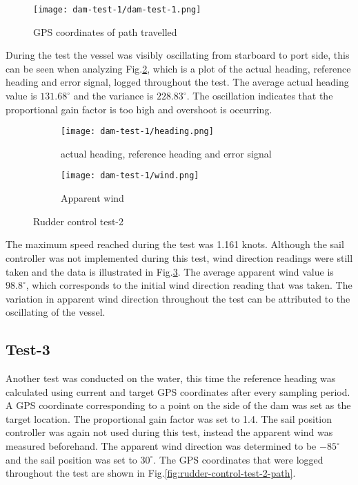 
\begin{figure}[h!]
    \centering
    \texttt{[image: dam-test-1/dam-test-1.png]}
    \caption[Path travelled in first rudder control test]{GPS coordinates of path travelled}
    \label{fig:rudder-control-test-1-path}
\end{figure}

 
During the test the vessel was visibly oscillating from starboard to port side, this can be seen when analyzing Fig.\ref{subfig:first-rudder-control-heading}, which is a plot of the actual 
heading, reference heading and error signal, logged throughout the test. The average actual heading value is $131.68^{\circ}$ and the variance is $228.83^{\circ}$. The oscillation indicates that 
the proportional gain factor is too high and overshoot is occurring. 

\begin{figure}[h!]
    \centering
    \begin{subfigure}{=0.75\linewidth}
        \centering
        \texttt{[image: dam-test-1/heading.png]}
        \caption{actual heading, reference heading and error signal}
        \label{subfig:first-rudder-control-heading}
    \end{subfigure}

    \begin{subfigure}{=0.75\linewidth}
        \centering
        \texttt{[image: dam-test-1/wind.png]}
        \caption{Apparent wind}
        \label{subfig:first-rudder-control-wind}
    \end{subfigure}

    \caption[Rudder control test-2]{Rudder control test-2}
    \label{fig:first-rudder-control-water}
\end{figure}


The maximum speed reached during the test was 1.161 knots. Although the sail controller was not implemented during this test, 
wind direction readings were still taken and the data is illustrated in Fig.\ref{subfig:first-rudder-control-wind}. The average apparent wind value is $98.8^{\circ}$, which corresponds to the initial 
wind direction reading that was taken. The variation in apparent wind direction throughout the test can be attributed to the oscillating of the vessel.

\subsection{Test-3}
\label{rudder-test-3}
Another test was conducted on the water, this time the reference heading was calculated using current and target GPS coordinates after every sampling period. A GPS coordinate corresponding to a 
point on the side of the dam was set as the target location. The proportional gain factor was set to 1.4. The sail position controller was again not used during this test, instead the apparent wind
was measured beforehand. The apparent wind direction was determined to be $-85^{\circ}$ and the sail position was set to $30^{\circ}$. The GPS coordinates that were logged throughout the test 
are shown in Fig.\ref{fig:rudder-control-test-2-path}.

